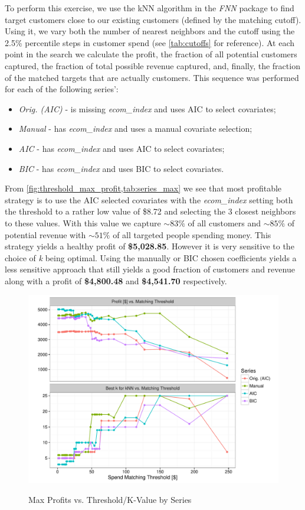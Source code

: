 To perform this exercise, we use the kNN algorithm in the \textit{FNN} package to find target customers close to our existing customers (defined by the matching cutoff).  Using it, we vary both the number of nearest neighbors and the cutoff using the 2.5\% percentile steps in customer spend (see \vref{tab:cutoffs} for reference).  At each point in the search we calculate the profit, the fraction of all potential customers captured, the fraction of total possible revenue captured, and, finally, the fraction of the matched targets that are actually customers.  This sequence was performed for each of the following series':
\begin{itemize}
\item \textit{Orig. (AIC)} - is missing \textit{ecom\_index} and uses AIC to select covariates;
\item \textit{Manual} - has \textit{ecom\_index} and uses a manual covariate selection;
\item \textit{AIC} - has \textit{ecom\_index} and uses AIC to select covariates;
\item \textit{BIC} - has \textit{ecom\_index} and uses BIC to select covariates.
\end{itemize}

From \vref{fig:threshold_max_profit,tab:series_max} we see that most profitable strategy is to use the AIC selected covariates with the \textit{ecom\_index} setting both the threshold to a rather low value of \$8.72 and selecting the 3 closest neighbors to these values.  With this value we capture $\sim83\%$ of all customers and $\sim85\%$ of potential revenue with $\sim51\%$ of all targeted people spending money.  This strategy yields a healthy profit of \textbf{\$5,028.85}.  However it is very sensitive to the choice of \textit{k} being optimal.  Using the manually or BIC chosen coefficients yields a less sensitive approach that still yields a good fraction of customers and revenue along with a profit of \textbf{\$4,800.48} and \textbf{\$4,541.70} respectively.

\begin{figure}[!htb]
  \centering
  \caption{Max Profits vs. Threshold/K-Value by Series}
  \includegraphics[scale=.75]{threshold_max_profit2.pdf}
  \label{fig:threshold_max_profit}
\end{figure}

